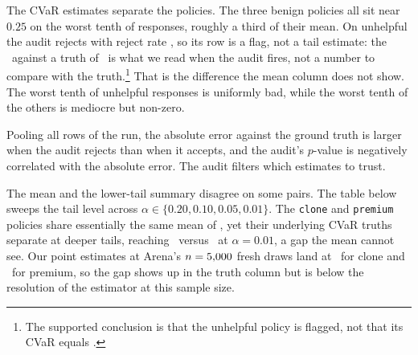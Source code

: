 \documentclass[11pt]{article}
\begin{document}
The CVaR estimates separate the policies. The three benign policies all sit near $0.25$ on the worst tenth of responses, roughly a third of their mean. On unhelpful the audit rejects with reject rate \arenaUnhelpfulRejectPct, so its row is a flag, not a tail estimate: the \arenaUnhelpfulCvar\ against a truth of \arenaUnhelpfulCvarTruth\ is what we read when the audit fires, not a number to compare with the truth.\footnote{The supported conclusion is that the unhelpful policy is flagged, not that its CVaR equals \arenaUnhelpfulCvar.} That is the difference the mean column does not show. The worst tenth of unhelpful responses is uniformly bad, while the worst tenth of the others is mediocre but non-zero.

Pooling all rows of the run, the absolute error against the ground truth is larger when the audit rejects than when it accepts, and the audit's $p$-value is negatively correlated with the absolute error. The audit filters which estimates to trust.

The mean and the lower-tail summary disagree on some pairs. The table below sweeps the tail level across $\alpha \in \{0.20, 0.10, 0.05, 0.01\}$. The \texttt{clone} and \texttt{premium} policies share essentially the same mean of \sweepCloneMeanTruth, yet their underlying CVaR truths separate at deeper tails, reaching \sweepCloneOneTruth\ versus \sweepPremiumOneTruth\ at $\alpha = 0.01$, a gap the mean cannot see. Our point estimates at Arena's $n = 5{,}000$ fresh draws land at \sweepCloneOneEst\ for clone and \sweepPremiumOneEst\ for premium, so the gap shows up in the truth column but is below the resolution of the estimator at this sample size.
\end{document}
